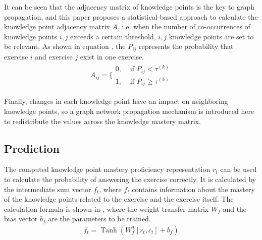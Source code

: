 It can be seen that the adjacency matrix of knowledge points is the key to graph propagation, and this paper proposes a statistical-based approach to calculate the knowledge point adjacency matrix \(A\), i.e. when the number of co-occurrences of knowledge points \(i,j\) exceeds a certain threshold, \(i,j\) knowledge points are set to be relevant. As shown in equation \eqname{\ref{fml:ch3-confidence}}, the \(P_{ij}\) represents the probability that exercise \(i\) and exercise \(j\) exist in one exercise.
\begin{align}\label{fml:ch3-confidence}
    A_{ij}=\{\begin{array}{ll}
        0, & \text{ if } P_{ij}<\tau^{(k)}      \\
        1, & \text{ if } P_{ij} \geq \tau^{(k)}
    \end{array}
\end{align}


Finally, changes in each knowledge point have an impact on neighboring knowledge points, so a graph network propagation mechanism is introduced here to redistribute the values across the knowledge mastery matrix.






\subsection{Prediction}
The computed knowledge point mastery proficiency representation \(r_t\) can be used to calculate the probability of answering the exercise correctly. It is calculated by the intermediate sum vector \(f_t\), where \(f_t\) contains information about the mastery of the knowledge points related to the exercise and the exercise itself. The calculation formula is shown in \eqname{\ref{fml:ch3-predicting-function-f}}, where the weight transfer matrix \(W_f\) and the bias vector \(b_f\) are the parameters to be trained.
\begin{align}\label{fml:ch3-predicting-function-f}
    f_t = \operatorname{Tanh}(W_f^T[r_t,c_t] + b_f)
\end{align}

